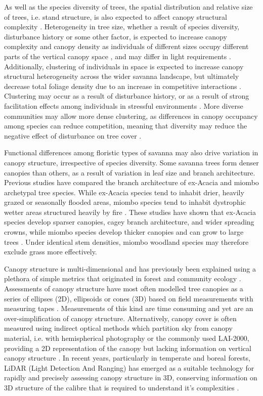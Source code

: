 \documentclass[11pt,a4paper]{article}
\begin{document}
As well as the species diversity of trees, the spatial distribution and relative size of trees, i.e. stand structure, is also expected to affect canopy structural complexity \citep{Stark2015}. Heterogeneity in tree size, whether a result of species diversity, disturbance history or some other factor, is expected to increase canopy complexity and canopy density as individuals of different sizes occupy different parts of the vertical canopy space \citep{Panzou2020}, and may differ in light requirements \citep{CharlesDominique2018}. Additionally, clustering of individuals in space is expected to increase canopy structural heterogeneity across the wider savanna landscape, but ultimately decrease total foliage density due to an increase in competitive interactions \citep{Dohn2017}. Clustering may occur as a result of disturbance history, or as a result of strong facilitation effects among individuals in stressful environments \citep{Ratcliffe2017}. More diverse communities may allow more dense clustering, as differences in canopy occupancy among species can reduce competition, meaning that diversity may reduce the negative effect of disturbance on tree cover \citep{}.

Functional differences among floristic types of savanna may also drive variation in canopy structure, irrespective of species diversity. Some savanna trees form denser canopies than others, as a result of variation in leaf size and branch architecture. Previous studies have compared the branch architecture of ex-Acacia and miombo archetypal tree species. While ex-Acacia species tend to inhabit drier, heavily grazed or seasonally flooded areas, miombo species tend to inhabit dystrophic wetter areas structured heavily by fire  \citep{Ribeiro2020}. These studies have shown that ex-Acacia species develop sparser canopies, cagey branch architecture, and wider spreading crowns, while miombo species develop thicker canopies and can grow to large trees \citep{Mugasha2013, Archibald2003, Privette2004}. Under identical stem densities, miombo woodland species may therefore exclude grass more effectively. 

Canopy structure is multi-dimensional and has previously been explained using a plethora of simple metrics that originated in forest and community ecology \citep{Kershaw2017}. Assessments of canopy structure have most often modelled tree canopies as a series of ellipses (2D), ellipsoids or cones (3D) based on field measurements with measuring tapes \citep{Jucker2015}. Measurements of this kind are time consuming and yet are an over-simplification of canopy structure. Alternatively, canopy cover is often measured using indirect optical methods which partition sky from canopy material, i.e. with hemispherical photography or the commonly used LAI-2000, providing a 2D representation of the canopy but lacking information on vertical canopy structure \citep{Jonckheere2004}. In recent years, particularly in temperate and boreal forests, LiDAR (Light Detection And Ranging) has emerged as a suitable technology for rapidly and precisely assessing canopy structure in 3D, conserving information on 3D structure of the calibre that is required to understand it's complexities \citep{Muir2018, Calders2020}.
\end{document}
